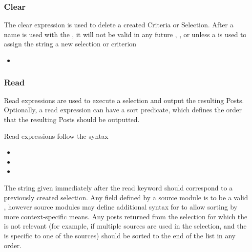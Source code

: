 \subsubsection{Clear}
The clear expression is used to delete a created Criteria or Selection. After a name is used with the
, it will not be valid in any future , , or 
unless a  is used to assign the string a new selection or criterion
\begin{itemize}[leftmargin=2in]
    \item[\nonterminal{clear\_expression}] \bnf{:}  
\end{itemize}

\subsubsection{Read}
Read expressions are used to execute a selection and output the resulting Posts. Optionally, a read
expression can have a sort predicate, which defines the order that the resulting Posts should be outputted.

Read expressions follow the syntax
\begin{itemize}[leftmargin=2in]
    \item[\nonterminal{read\_expression}] \bnf{:}   
    \item[\nonterminal{sort\_predicate}] \bnf{:} \bnf{(} \bnf{|} \bnf{)}   
    \item[\nonterminal{order}] \bnf{:}  \bnf{|}  
\end{itemize}

The string given immediately after the read keyword should correspond to a previously created selection.
Any field defined by a source module is to be a valid , however source modules may define additional
syntax for  to allow sorting by more context-specific means. Any posts returned from the selection
for which the  is not relevant (for example, if multiple sources are used in the selection, and the
 is specific to one of the sources) should be sorted to the end of the list in any order.

